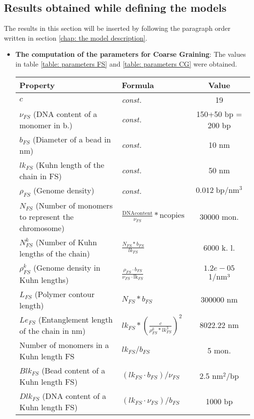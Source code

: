 \subsection{Results obtained while defining the models}
The results in this section will be inserted by following the paragraph order written in section \ref{chap: the model description}.
\begin{itemize}
    \item \textbf{The computation of the parameters for Coarse Graining}: The values in table \ref{table: parameters FS} and \ref{table: parameters CG} were obtained.

\begin{table}[H]

    \begin{tabular}{|l|l|c|}
    \hline
    \textbf{Property} & \textbf{Formula} & \textbf{Value}\\
    \hline
    \textbf{$c$} & \textit{const.} & 19\\
    \hline
    \textbf{$\nu_{FS}$} (DNA content of a monomer in b.) & \textit{const.} & 150+50 bp = 200 bp\\
    \hline
    \textbf{$b_{FS}$} (Diameter of a bead in nm) & \textit{const.} & 10 nm\\
    \hline
    \textbf{$lk_{FS}$} (Kuhn length of the chain  in FS) & \textit{const.} & 50 nm \\
    \hline
    \textbf{$\rho_{FS}$} (Genome density) &\textit{const.} & $0.012\; \text{bp}/\text{nm}^3$\cite{golkaramRoleChromatinDensity2017} \\ 
    \hline
    \textbf{$N_{FS}$} (Number of monomers to represent the chromosome) & $\frac{\text{DNAcontent}}{\nu_{FS}} * \text{ncopies}$ & 30000 mon.\\
    \hline
    \textbf{$N^k_{FS}$} (Number of Kuhn lengths of the chain) & $\frac{N_{FS} * b_{FS}}{lk_{FS}}$ & 6000 k. l.\\
    \hline
    \textbf{$\rho^k_{FS}$} (Genome density in Kuhn lengths) & $\frac{\rho_{FS} \cdot b_{FS}}{\nu_{FS} \cdot \text{lk}_{FS}}$& $1.2e-05$ 1/nm³\\
    \hline
    \textbf{$L_{FS}$} (Polymer contour length) & $N_{FS} * b_{FS}$ & 300000 nm\\
    \hline
    \textbf{$Le_{FS}$} (Entanglement length of the chain in nm) & $lk_{FS} * \left(\frac{c}{\rho^k_{FS} * lk_{FS}^3}\right)^2$ & 8022.22 nm\\
    \hline
    Number of monomers in a Kuhn length FS & $lk_{FS}/b_{FS}$ & 5 mon.\\
    \hline
    $Blk_{FS}$ (Bead content of a Kuhn length FS) & $(lk_{FS} \cdot b_{FS})/\nu_{FS}$ & 2.5 $\text{nm}^2$/bp  \\
    \hline
    $Dlk_{FS}$ (DNA content of a Kuhn length FS) & $(lk_{FS} \cdot \nu_{FS})/b_{FS}$ & 1000 $\text{bp}$\\
    \hline
    

\end{tabular}
\end{table}
\end{itemize}
